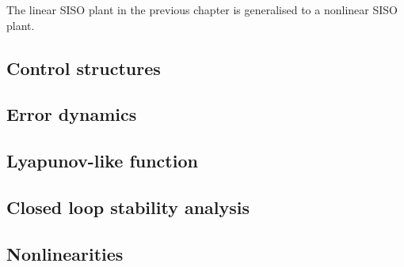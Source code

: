 The linear SISO plant in the previous chapter is generalised to
a nonlinear SISO plant.\\



\subsection{Control structures}


\subsection{Error dynamics}


\subsection{Lyapunov-like function}


\subsection{Closed loop stability analysis}


\subsection{Nonlinearities}



